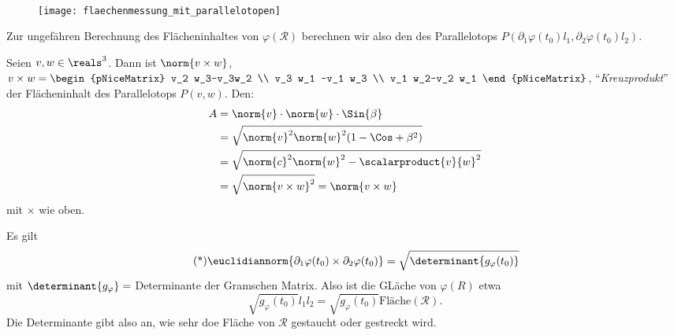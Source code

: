 \begin{frage}
\begin{eigenschaftenenumerate}
\begin{gather*}
    \end{gather*}
    \begin{figure}[H]
      \centering
      \texttt{[image: flaechenmessung\_mit\_parallelotopen]}
      \label{fig:flaechenmessung_mit_parallelotopen}
    \end{figure}
    Zur ungefähren Berechnung des Flächeninhaltes von \( \varphi(\mathcal{R}) \) berechnen wir also den des Parallelotops \( P(\partial_1 \varphi(t_0)l_1,\partial_2 \varphi(t_0)l_2) \).
    \item Seien \( v,w\in \reals^3 \). Dann ist \( \norm{v\times w} \), \( v\times w=\begin{pNiceMatrix} v_2 w_3-v_3w_2 \\ v_3 w_1 -v_1 w_3 \\ v_1 w_2-v_2 w_1 \end{pNiceMatrix} \), \enquote{\emph{Kreuzprodukt}} der Flächeninhalt des Parallelotops \( P(v,w) \). Den:
    \begin{align*}
      A&=\norm{v}\cdot\norm{w}\cdot\Sin{\beta}\\
      &=\sqrt{\norm{v}^2\norm{w}^2(1-\Cos+{\beta}^2)}\\
      &=\sqrt{\norm{c}^2\norm{w}^2-\scalarproduct{v}{w}^2}\\
      &=\sqrt{\norm{v\times w}^2}=\norm{v\times w}
    \end{align*}
    mit \( \times \) wie oben.
    \item Es gilt
    \begin{equation*}
      \label{eq:flaecheninhalt_durch_determinante_gegeben}\tag{*} \euclidiannorm{\partial_1 \varphi(t_0)\times\partial_2 \varphi(t_0)}=\sqrt{\determinant{g_{\varphi}(t_0)}}
    \end{equation*}
    mit \( \determinant{g_{\varphi}}= \) Determinante der Gramschen Matrix. Also ist die GLäche von \( \varphi(R) \) etwa 
    \begin{equation*}
      \sqrt{g_{\varphi}(t_0)}l_1 l_2=\sqrt{g_{\varphi}(t_0)}\text{Fläche}(\mathcal{R}).
    \end{equation*}
    Die Determinante gibt also an, wie sehr doe Fläche von \( \mathcal{R} \) gestaucht oder gestreckt wird.


\end{eigenschaftenenumerate}
\end{frage}
